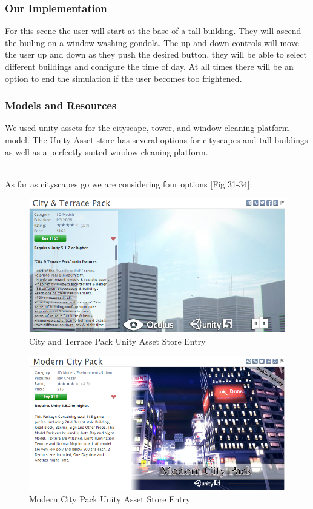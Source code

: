 \documentclass[a4paper,10pt]{article}
\begin{document}
\subsubsection{Our Implementation}
For this scene the user will start at the base of a tall building. They will ascend the builing on a window washing gondola. The up and down controls will move the user up and down as they push the desired button, they will be able to select different buildings and configure the time of day. At all times there will be an option to end the simulation if the user becomes too frightened.

\subsubsection{Models and Resources}
We used unity assets for the cityscape, tower, and window cleaning platform model. The Unity Asset store has several options for cityscapes and tall buildings as well as a perfectly suited window cleaning platform.
\par~\\ 
As far as cityscapes go we are considering four options [Fig 31-34]:
\begin{figure}[H] %
	\centerline {\includegraphics[scale = 0.50]{cityAndTerracePack.png}}
	\caption{City and Terrace Pack Unity Asset Store Entry}
	\label{fig:cityAndTerracePack}
\end{figure}
\begin{figure}[H] %
	\centerline {\includegraphics[scale = 0.50]{modernCityPack.png}}
	\caption{Modern City Pack Unity Asset Store Entry}
	\label{fig:modernCityPack}
\end{figure}
\end{document}
